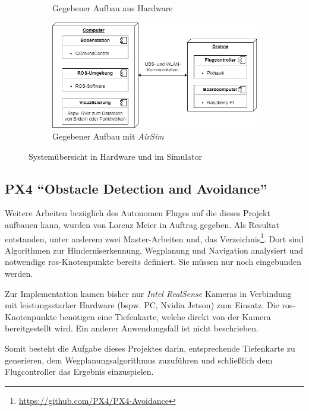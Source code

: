 \begin{figure}
\begin{subfigure}{0.5\linewidth}
        \caption{Gegebener Aufbau aus Hardware}
        \label{fig:sim2}
        \end{subfigure}
    \hfill
    \begin{subfigure}{0.7\linewidth}
        \includegraphics[width=\linewidth]{images/setup_simulator-Page-3.drawio.png}
        \caption{Gegebener Aufbau mit \textit{AirSim}}
        \label{fig:sim3}
        \end{subfigure}
         
    \caption{Systemübersicht in Hardware und im Simulator}
    \label{fig:simulator_aufbauten}
    \end{figure}

\subsection{PX4 \enquote{Obstacle Detection and Avoidance}}
Weitere Arbeiten bezüglich des Autonomen Fluges auf die dieses Projekt aufbauen kann, wurden von Lorenz Meier in Auftrag gegeben. Als Resultat entstanden, unter anderem zwei Master-Arbeiten und, das Verzeichnis\footnote{\url{https://github.com/PX4/PX4-Avoidance}\cite{dronecodestiftungPX4UserGuide}}. Dort sind Algorithmen zur Hinderniserkennung, Wegplanung und Navigation analysiert und notwendige \acrshort{ros}-Knotenpunkte bereits definiert. Sie müssen nur noch eingebunden werden.

Zur Implementation kamen bisher nur \textit{Intel RealSense} Kameras in Verbindung mit leistungsstarker Hardware (bspw. PC, Nvidia Jetson) zum Einsatz. Die \acrshort{ros}-Knotenpunkte benötigen eine Tiefenkarte, welche direkt von der Kamera bereitgestellt wird. Ein anderer Anwendungsfall ist nicht beschrieben.

Somit besteht die Aufgabe dieses Projektes darin, entsprechende Tiefenkarte zu generieren, dem Wegplanungsalgorithmus zuzuführen und schließlich dem Flugcontroller das Ergebnis einzuspielen.


